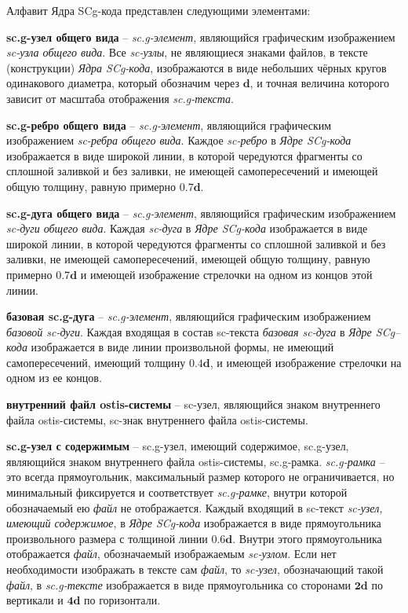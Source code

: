 Алфавит Ядра SCg-кода представлен следующими элементами:
\begin{textitemize}
	\item \textbf{sc.g-узел общего вида} -- \textit{sc.g-элемент}, являющийся графическим изображением \textit{sc-узла общего вида}. Все \textit{sc-узлы}, не являющиеся знаками файлов, в тексте (конструкции) \textit{Ядра SCg-кода}, изображаются в виде небольших чёрных кругов одинакового диаметра, который обозначим через $\bm{d}$, и точная величина которого зависит от масштаба отображения \textit{sc.g-текста}.
	
	\item \textbf{sc.g-ребро общего вида} -- \textit{sc.g-элемент}, являющийся графическим изображением \textit{sc-ребра общего вида}. Каждое \textit{sc-ребро} в \textit{Ядре SCg-кода} изображается в виде широкой линии, в которой чередуются фрагменты со сплошной заливкой и без заливки, не имеющей самопересечений и имеющей общую толщину, равную примерно $\bm{0.7d}$.
	
	\item \textbf{sc.g-дуга общего вида} -- \textit{sc.g-элемент}, являющийся графическим изображением \textit{sc-дуги общего вида}. Каждая \textit{sc-дуга} в \textit{Ядре SCg-кода} изображается в виде широкой линии, в которой чередуются фрагменты со сплошной заливкой и без заливки, не имеющей самопересечений, имеющей общую толщину, равную примерно $\bm{0.7d}$ и имеющей изображение стрелочки на одном из концов этой линии.
	
	\item \textbf{базовая sc.g-дуга} -- \textit{sc.g-элемент}, являющийся графическим изображением \textit{базовой sc-дуги}. Каждая входящая в состав sc-текста \textit{базовая sc-дуга} в \textit{Ядре SCg--кода} изображается в виде линии произвольной формы, не имеющий самопересечений, имеющий толщину $\bm{0.4d}$, и имеющей изображение стрелочки на одном из ее концов.
	
	\item \textbf{внутренний файл ostis-системы} -- sc-узел, являющийся знаком внутреннего файла ostis-системы, sc-знак внутреннего файла ostis-системы.
	
	\item \textbf{sc.g-узел с содержимым} -- sc.g-узел, имеющий содержимое, sc.g-узел, являющийся знаком внутреннего файла ostis-системы, sc.g-рамка. \textit{sc.g-рамка} -- это всегда прямоугольник, максимальный размер которого не ограничивается, но минимальный фиксируется и соответствует \textit{sc.g-рамке}, внутри которой обозначаемый ею \textit{файл} не отображается. Каждый входящий в sc-текст \textit{sc-узел, имеющий содержимое}, в \textit{Ядре SCg-кода} изображается в виде прямоугольника произвольного размера с толщиной линии $\bm{0.6d}$. Внутри этого прямоугольника отображается \textit{файл}, обозначаемый изображаемым \textit{sc-узлом}. Если нет необходимости изображать в тексте сам \textit{файл}, то \textit{sc-узел}, обозначающий такой \textit{файл}, в \textit{sc.g-тексте} изображается в виде прямоугольника со сторонами $\bm{2d}$ по вертикали и $\bm{4d}$ по горизонтали.
\end{textitemize}


